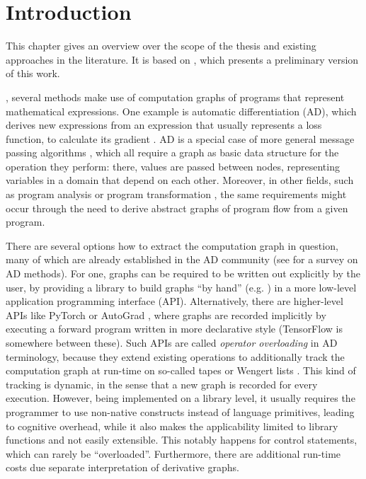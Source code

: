 \chapter{Introduction}
\label{cha:introduction}

This chapter gives an overview over the scope of the thesis and existing approaches in the
literature.  It is based on \textcite{gabler2019graph}, which presents a preliminary version of this
work.

, several methods make use of computation graphs of programs that
represent mathematical expressions.  One example is automatic differentiation (AD), which derives
new expressions from an expression that usually represents a loss function, to calculate its
gradient \parencite{griewank2008evaluating, gebremedhin2020introduction}.  AD is a special case of
more general message passing algorithms
\parencite{minka2005divergence,ruozzi2011message,minka2019automatic}, which all require a graph as
basic data structure for the operation they perform: there, values are passed between nodes,
representing variables in a domain that depend on each other.  Moreover, in other fields, such as
program analysis or program transformation
\parencite[cf.][]{muchnick1997advanced,singer2018static,aho1986compilers}, the same requirements
might occur through the need to derive abstract graphs of program flow from a given program.

There are several options how to extract the computation graph in question, many of which are
already established in the AD community (see \textcite{baydin2018automatic} for a survey on AD
methods).  For one, graphs can be required to be written out explicitly by the user, by providing a
library to build graphs \enquote{by hand} (e.g. \textcite{chewxy2020gorgonia,jia2014caffe}) in a
more low-level application programming interface (API).  Alternatively, there are higher-level APIs
like PyTorch \parencite{paszke2017automatic} or AutoGrad \parencite{maclaurin2015autograd}, where
graphs are recorded implicitly by executing a forward program written in more declarative style
(TensorFlow \parencite{abadi2015tensorflow} is somewhere between these).  Such APIs are called
\emph{operator overloading} in AD terminology, because they extend existing operations to
additionally track the computation graph at run-time on so-called tapes or Wengert lists
\parencite{bartholomew-biggs2000automatic}.  This kind of tracking is dynamic, in the sense that a
new graph is recorded for every execution.  However, being implemented on a library level, it
usually requires the programmer to use non-native constructs instead of language primitives, leading
to cognitive overhead, while it also makes the applicability limited to library functions and not
easily extensible.  This notably happens for control statements, which can rarely be
\enquote{overloaded}.  Furthermore, there are additional run-time costs due separate interpretation
of derivative graphs.

